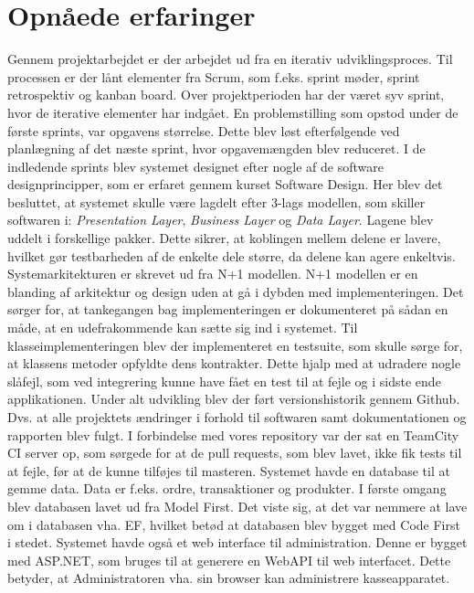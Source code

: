 \section{Opnåede erfaringer}
Gennem projektarbejdet er der arbejdet ud fra en iterativ udviklingsproces. Til processen er der lånt elementer fra Scrum, som f.eks. sprint møder, sprint retrospektiv og kanban board. Over projektperioden har der været syv sprint, hvor de iterative elementer har indgået. En problemstilling som opstod under de første sprints, var opgavens størrelse. Dette blev løst efterfølgende ved planlægning af det næste sprint, hvor opgavemængden blev reduceret.
\newline\newline
I de indledende sprints blev systemet designet efter nogle af de software designprincipper, som er erfaret gennem kurset Software Design. Her blev det besluttet, at systemet skulle være lagdelt efter 3-lags modellen, som skiller softwaren i: \textit{Presentation Layer}, \textit{Business Layer} og \textit{Data Layer}. Lagene blev uddelt i forskellige pakker. Dette sikrer, at koblingen mellem delene er lavere, hvilket gør testbarheden af de enkelte dele større, da delene kan agere enkeltvis.
\newline\newline
Systemarkitekturen er skrevet ud fra N+1 modellen. N+1 modellen er en blanding af arkitektur og design uden at gå i dybden med implementeringen. Det sørger for, at tankegangen bag implementeringen er dokumenteret på sådan en måde, at en udefrakommende kan sætte sig ind i systemet.
\newline\newline 
Til klasseimplementeringen blev der implementeret en testsuite, som skulle sørge for, at klassens metoder opfyldte dens kontrakter. Dette hjalp med at udradere nogle slåfejl, som ved integrering kunne have fået en test til at fejle og i sidste ende applikationen.
\newline\newline
Under alt udvikling blev der ført versionshistorik gennem Github. Dvs. at alle projektets ændringer i forhold til softwaren samt dokumentationen og rapporten blev fulgt. I forbindelse med vores repository var der sat en TeamCity CI server op, som sørgede for at de pull requests, som blev lavet, ikke fik tests til at fejle, før at de kunne tilføjes til masteren.
\newline\newline
Systemet havde en database til at gemme data. Data er f.eks. ordre, transaktioner og produkter. I første omgang blev databasen lavet ud fra Model First. Det viste sig, at det var nemmere at lave om i databasen vha. EF, hvilket betød at databasen blev bygget med Code First i stedet.
\newline\newline
Systemet havde også et web interface til administration. Denne er bygget med ASP.NET, som bruges til at generere en WebAPI til web interfacet. Dette betyder, at Administratoren vha. sin browser kan administrere kasseapparatet.